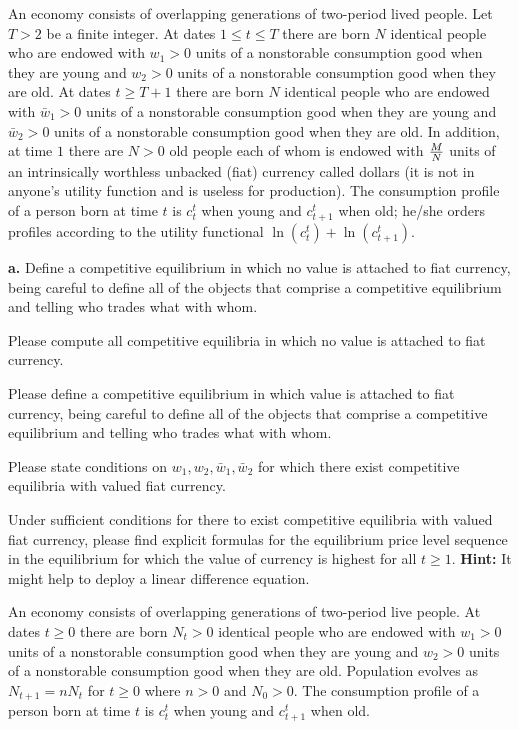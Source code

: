 \medskip
{}
\medskip
\noindent An economy consists of overlapping generations of two-period lived people.  Let $T > 2$ be a finite 
integer. At dates $1 \leq  t \leq T$ there are born
$N$ identical people who are endowed with $w_1 >0$ units of a nonstorable consumption good when they
are young and $w_2>0 $ units of a nonstorable consumption good when they are old.  
At dates $t \geq T+1$ there are born
$N$ identical people who are endowed with $\bar w_1 >0$ units of a nonstorable consumption good when they
are young and $\bar w_2>0$ units of a nonstorable consumption good when they are old. In addition, at time $1$ there
are $N> 0$ old people each of whom is endowed with ${M \over N}$ units of an intrinsically worthless unbacked (fiat) currency called
dollars (it is not in anyone's utility function and is useless for production). The consumption profile
of a person born at time $t$ is $c_t^t$ when young and $c_{t+1}^t$ when old; he/she orders profiles according to the
utility functional
$ \ln (c_t^t) + \ln (c^t_{t+1}) .$


\medskip
\noindent 
{\bf a.} Define a competitive equilibrium in which no value is attached to fiat currency, being careful to define all
of the objects that comprise a competitive equilibrium and telling who trades what with whom.

\medskip
{} Please compute all competitive equilibria in which no value is attached to fiat currency.

\medskip
{} Please define a competitive equilibrium in which value is attached to fiat currency, 
being careful to define all
of the objects that comprise a competitive equilibrium and telling who trades what with whom.

\medskip
{} Please state conditions on $w_1, w_2, \bar w_1, \bar w_2$ for which there exist competitive
equilibria with valued fiat currency.

\medskip
{} Under sufficient conditions for there to exist competitive equilibria with valued fiat currency,
please find explicit formulas for the equilibrium price level sequence in the equilibrium for which the value
of currency is highest for all $t \geq 1$. {\bf Hint:} It might help to deploy a linear difference equation.



\medskip
{}
\medskip
\noindent   An economy consists of overlapping generations of two-period live people. At dates $t \geq 0$ there are born
$N_t >0$ identical people who are endowed with $w_1 >0$ units of a nonstorable consumption good when they
are young and $w_2 >0 $ units of a nonstorable consumption good when they are old.  Population evolves as $N_{t+1} = n N_t$ for $t \geq 0$ where $n >0$ and $N_0 >0$.  The consumption profile
of a person born at time $t$ is $c_t^t$ when young and $c_{t+1}^t$ when old.

